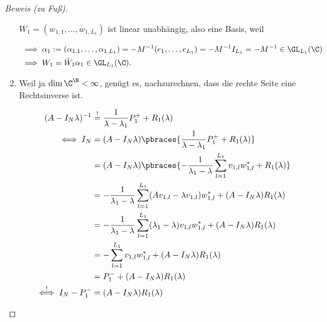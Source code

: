 \begin{proof}[Beweis (zu Fuß)]
\begin{enumerate}[label = (\roman*)]
        $W_1 = (w_{1, 1}, \dots, w_{1, L_1})$ ist linear unabhängig, also eine Basis, weil

        \begin{align*}
            & \implies
            \alpha_1
            :=
            (\alpha_{1, 1}, \dots, \alpha_{1, L_1})
            =
            -M^{-1} (e_1, \dots, e_{L_1})
            =
            -M^{-1} I_{L_1}
            =
            -M^{-1}
            \in
            \GL_{L_1}(\C) \\
            & \implies
            W_1
            =
            \hat W_1 \alpha_1
            \in
            \GL_{L_1}(\C).
        \end{align*}

        \item Weil ja $\dim \C^\N < \infty$, genügt es, nachzurechnen, dass die rechte Seite eine Rechtsinverse ist.
        
        \begin{align*}
            (A - I_N \lambda)^{-1}
            & \stackrel{!}{=}
            \frac{1}{\lambda - \lambda_1} P_1^+
            +
            R_1(\lambda) \\
            \iff
            I_N
            & =
            (A - I_N \lambda)
            \pbraces
            {
                \frac{1}{\lambda - \lambda_1} P_1^+
                +
                R_1(\lambda)
            } \\
            & =
            (A - I_N \lambda)
            \pbraces
            {
                -\frac{1}{\lambda_1 - \lambda}
                \sum_{l=1}^{L_1}
                    v_{1, l} w_{1, l}^\ast
                +
                R_1(\lambda)
            } \\
            & =
            -\frac{1}{\lambda_1 - \lambda}
            \sum_{l=1}^{L_1}
                (
                    A v_{1, l}
                    -
                    \lambda v_{1, l}
                )
                w_{1, l}^\ast
            +
            (A - I_N \lambda) R_1(\lambda) \\
            & =
            -\frac{1}{\lambda_1 - \lambda}
            \sum_{l=1}^{L_1}
                (\lambda_1 - \lambda) v_{1, l} w_{1, l}^\ast
            +
            (A - I_N \lambda)
            R_1(\lambda) \\
            & =
            -\sum_{l=1}^{L_1}
                v_{1, l} w_{1, l}^\ast
            +
            (A - I_N \lambda)
            R_1(\lambda) \\
            & =
            P_1^-
            +
            (A - I_N \lambda)
            R_1(\lambda) \\
            \stackrel{!}{\iff}
            I_N - P_1^-
            & =
            (A - I_N \lambda) R_1(\lambda)
        \end{align*}


\end{enumerate}
\end{proof}
